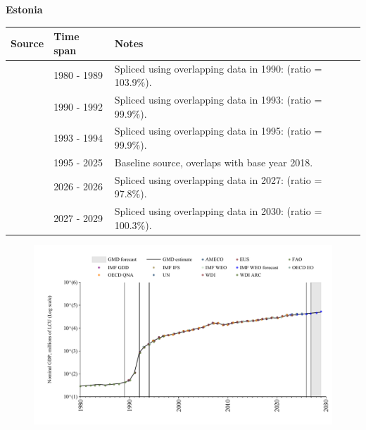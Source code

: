 \documentclass[12pt,a4paper,landscape]{article}
\begin{document}
\begin{adjustbox}{max totalsize={\paperwidth}{\paperheight},center}
\begin{minipage}[t][\textheight][t]{\textwidth}
\vspace*{0.5cm}
{}
\begin{center}
{\Large\bfseries Estonia}
\end{center}
\vspace{0.5cm}
\begin{table}[H]
\centering
\small
\begin{tabular}{|l|l|l|}
\hline
\textbf{Source} & \textbf{Time span} & \textbf{Notes} \\
\hline
\rowcolor{white}\cite{WDI_ARC}& 1980 - 1989 &Spliced using overlapping data in 1990: (ratio = 103.9\%).\\
\rowcolor{lightgray}\cite{WDI}& 1990 - 1992 &Spliced using overlapping data in 1993: (ratio = 99.9\%).\\
\rowcolor{white}\cite{AMECO}& 1993 - 1994 &Spliced using overlapping data in 1995: (ratio = 99.9\%).\\
\rowcolor{lightgray}\cite{OECD_EO}& 1995 - 2025 &Baseline source, overlaps with base year 2018.\\
\rowcolor{white}\cite{AMECO}& 2026 - 2026 &Spliced using overlapping data in 2027: (ratio = 97.8\%).\\
\rowcolor{lightgray}\cite{IMF_WEO_forecast}& 2027 - 2029 &Spliced using overlapping data in 2030: (ratio = 100.3\%).\\
\hline
\end{tabular}
\end{table}
\begin{figure}[H]
\centering
\includegraphics[width=\textwidth,height=0.6\textheight,keepaspectratio]{graphs/EST_nGDP.pdf}
\end{figure}
\end{minipage}
\end{adjustbox}
\end{document}
